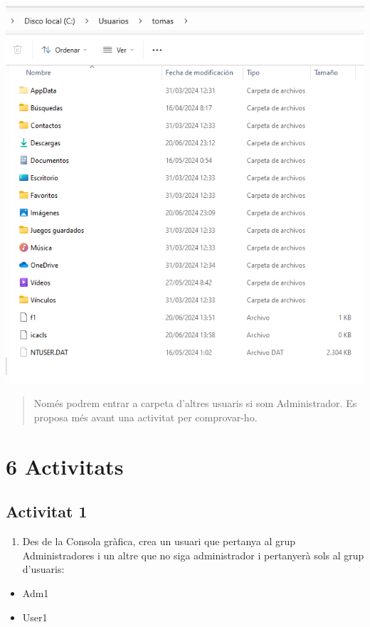 \documentclass[
  a4paper,
]{article}
\providecommand{\tightlist}{%
  \setlength{\itemsep}{0pt}\setlength{\parskip}{0pt}}
\begin{document}
\includegraphics{png/CarpetesPerfil.png}

\begin{quote}
Només podrem entrar a carpeta d'altres usuaris si som Administrador. Es
proposa més avant una activitat per comprovar-ho.
\end{quote}

\newpage

\section{6 Activitats}\label{activitats}

\subsection{Activitat 1}\label{activitat-1}

\begin{enumerate}
\def\labelenumi{\arabic{enumi}.}
\tightlist
\item
  Des de la Consola gràfica, crea un usuari que pertanya al grup
  Administradores i un altre que no siga administrador i pertanyerà sols
  al grup d'usuaris:
\end{enumerate}

\begin{itemize}
\tightlist
\item
  Adm1
\item
  User1
\end{itemize}
\end{document}
